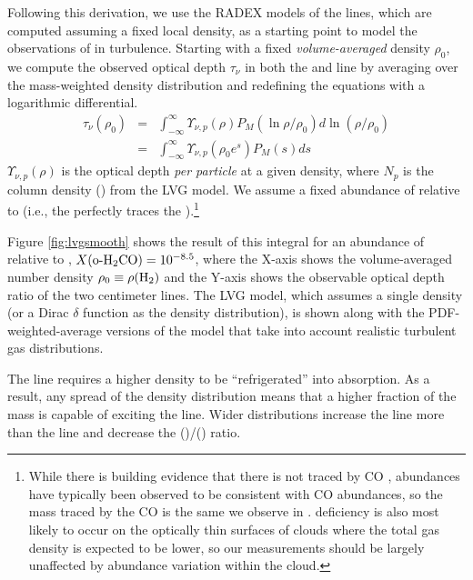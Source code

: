 Following this derivation,
we use the RADEX models of the \formaldehyde lines, which are computed assuming a
fixed local density, as a starting point to model the observations of
\formaldehyde in turbulence.   Starting with a fixed \emph{volume-averaged}
density $\rho_0$, we compute the observed \formaldehyde optical depth $\tau_\nu$ in both
the \oneone and \twotwo
line by averaging over the mass-weighted density distribution and redefining the equations with
a logarithmic differential. %
\begin{eqnarray}
    \label{eqn:tauintegral}
    \tau_{\nu}(\rho_0) &=& \int_{-\infty}^\infty \Upsilon_{\nu,p}(\rho) P_M(\ln \rho/\rho_0) d \ln (\rho/\rho_0)\\
                       &=& \int_{-\infty}^\infty \Upsilon_{\nu,p}(\rho_0 e^s) P_M(s) d s
\end{eqnarray} %
$\Upsilon_{\nu,p}(\rho)$ is the optical depth \emph{per particle} at a given density, where $N_p$ is the column
density (\perkmspc) from the LVG model.
We assume a fixed abundance of \ortho relative to \hh
(i.e., the \formaldehyde perfectly traces the \hh).\footnote{While there is
building evidence that there is \hh not traced by CO
\citep{Glover2010a,Shetty2011b,Shetty2011a},  \formaldehyde abundances have
typically been observed to be
consistent with CO abundances, so the mass traced by the CO is the same
we observe in \formaldehyde.  \formaldehyde deficiency is also most likely to
occur on the optically thin surfaces of clouds where the total gas density is
expected to be lower, so our measurements should be largely unaffected by
abundance variation within the cloud.}

Figure \ref{fig:lvgsmooth}
shows the result of this integral for an abundance of \ortho relative to \hh, 
$X(\textrm{o-H}_2\textrm{CO})=10^{-8.5}$, where the X-axis shows the volume-averaged number density $\rho_0 \equiv \rho(\textrm{H}_{2})$ and the Y-axis
shows the observable optical depth ratio of the two \formaldehyde centimeter
lines.
The LVG model, which assumes a single density
(or a Dirac $\delta$ function as the density distribution), is shown along with
the PDF-weighted-average versions of the model that take into account realistic turbulent
gas distributions.  

The \formaldehyde \twotwo line requires a higher density to be ``refrigerated''
into absorption.  As a result, any spread of the density distribution means
that a higher fraction of the mass is capable of exciting the \twotwo line.
Wider distributions increase the \twotwo line more than the \oneone line and
decrease the (\oneone)/(\twotwo) ratio.  

